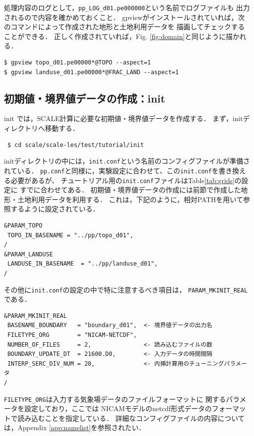 処理内容のログとして，\verb|pp_LOG_d01.pe000000|という名前でログファイルも
出力されるので内容を確かめておくこと．
gpviewがインストールされていれば，次のコマンドによって作成された地形と土地利用データを
描画してチェックすることができる．
正しく作成されていれば，Fig. \ref{fig:domain}と同じように描かれる．
\begin{verbatim}
$ gpview topo_d01.pe00000*@TOPO --aspect=1
$ gpview landuse_d01.pe00000*@FRAC_LAND --aspect=1
\end{verbatim}


\subsection{初期値・境界値データの作成：init}

init では，SCALE計算に必要な初期値・境界値データを作成する．
まず，initディレクトリへ移動する．
\begin{verbatim}
 $ cd scale/scale-les/test/tutorial/init
\end{verbatim}

initディレクトリの中には，\verb|init.conf|という名前のコンフィグファイルが準備されている．
\verb|pp.conf|と同様に，実験設定に合わせて、この\verb|init.conf|を書き換える必要があるが、
チュートリアル用の\verb|init.conf|ファイルはTable\ref{tab:grids}の設定に
すでに合わせてある．
初期値・境界値データの作成には前節で作成した地形・土地利用データを利用する．
これは，下記のように，相対PATHを用いて参照するように設定されている．

\begin{verbatim}
&PARAM_TOPO
 TOPO_IN_BASENAME = "../pp/topo_d01",
/
&PARAM_LANDUSE
 LANDUSE_IN_BASENAME  = "../pp/landuse_d01",
/
\end{verbatim}
その他に\verb|init.conf|の設定の中で特に注意するべき項目は，
\verb|PARAM_MKINIT_REAL|である．

\begin{verbatim}
&PARAM_MKINIT_REAL
 BASENAME_BOUNDARY   = "boundary_d01",  <- 境界値データの出力名
 FILETYPE_ORG        = "NICAM-NETCDF",
 NUMBER_OF_FILES     = 2,               <- 読み込むファイルの数
 BOUNDARY_UPDATE_DT  = 21600.D0,        <- 入力データの時間間隔
 INTERP_SERC_DIV_NUM = 20,              <- 内挿計算用のチューニングパラメータ
/
\end{verbatim}

\verb|FILETYPE_ORG|は入力する気象場データのファイルフォーマットに
関するパラメータを設定しており，ここでは
NICAMモデルのnetcdf形式データのフォーマットで読み込むことを指定している．
詳細なコンフィグファイルの内容については，Appendix \ref{app:namelist}を参照されたい．

